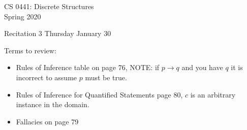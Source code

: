 \documentclass[12pt]{article}
\newcommand\buf{\vspace{0.10in}}
\begin{document}
\begin{center}
CS 0441: Discrete Structures \\
{\smaller[1] Spring 2020} \\

\vspace {0.25in}

Recitation 3 \hspace {0.25in} Thursday January 30

\vspace{0.25in}

\null \hfill

\end{center}

Terms to review:

\begin{itemize}
	\item Rules of Inference table on page 76, NOTE: if $p \to q$ and you have $q$ it is incorrect to assume $p$ must be true.
	\item Rules of Inference for Quantified Statements page 80, $c$ is an arbitrary instance in the domain.
	\item Fallacies on page 79
\end{itemize}

\buf
\end{document}

